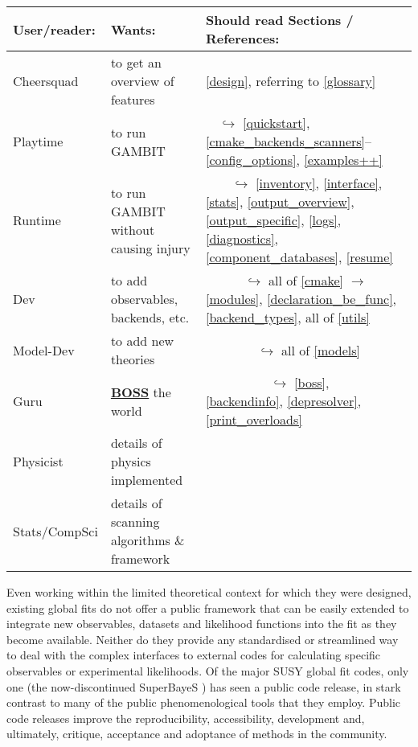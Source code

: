 \documentclass[pdftex,twocolumn,epjc3_preprint,runningheads]{svjour3}
\renewcommand{\_}{\discretionary{\underscore}{}{\underscore}}
\newcommand{\doublecrosssf}[2]{\hyperref[#2]{\textbf{\textsf{#1}}}}
\newcommand{\gambit}{\textsf{GAMBIT}\xspace}
\newcommand{\GB}{\gambit}
\begin{document}
\begin{table*}[tb]
\centering
\caption{A \GB reading list \label{readinglist}}
\begin{tabular}{lll}
\hline
User/reader: & Wants: & Should read Sections / References: \\
\hline
Cheersquad     & to get an overview of features                   &  \ref{design}, referring to \ref{glossary} \\
Playtime       & to run \GB                                       &  ~~$\hookrightarrow$ \ref{quickstart}, \ref{cmake_backends_scanners}--\ref{config_options}, \ref{examples++} \\
Runtime        & to run \GB without causing injury                &  ~~~~$\hookrightarrow$ \ref{inventory}, \ref{interface}, \ref{stats}, \ref{output_overview}, \ref{output_specific}, \ref{logs}, \ref{diagnostics}, \ref{component_databases}, \ref{resume} \\
Dev            & to add observables, backends, etc.               &  ~~~~~~$\hookrightarrow$ all of \ref{cmake} $\rightarrow$ \ref{modules}, \ref{declaration_be_func}, \ref{backend_types}, all of \ref{utils} \\
Model-Dev      & to add new theories                              &  ~~~~~~~~$\hookrightarrow$ all of \ref{models} \\
Guru           & \doublecrosssf{BOSS}{BOSS} the world             &  ~~~~~~~~~~$\hookrightarrow$ \ref{boss}, \ref{backendinfo}, \ref{depresolver}, \ref{print_overloads} \\
\hline
Physicist      & details of physics implemented              &  \cite{ColliderBit,FlavBit,DarkBit,SDPBit} \\
Stats/CompSci  & details of scanning algorithms \& framework &  \cite{ScannerBit} \\
\hline
\end{tabular}
\end{table*}

Even working within the limited theoretical context for which they were designed, existing global fits do not offer a public framework that can be easily extended to integrate new observables, datasets and likelihood functions into the fit as they become available.  Neither do they provide any standardised or streamlined way to deal with the complex interfaces to external codes for calculating specific observables or experimental likelihoods.  Of the major SUSY global fit codes, only one (the now-discontinued \textsf{SuperBayeS} \cite{SBWeb}) has seen a public code release, in stark contrast to many of the public phenomenological tools that they employ.  Public code releases improve the reproducibility, accessibility, development and, ultimately, critique, acceptance and adoptance of methods in the community.
\end{document}
